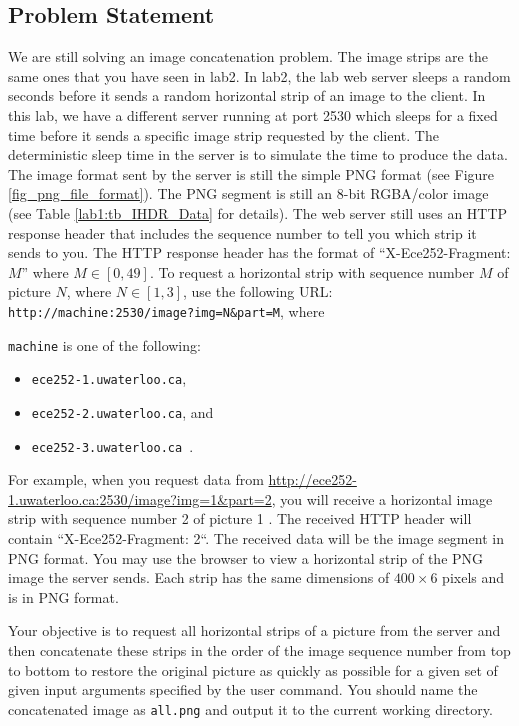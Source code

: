 \subsection{Problem Statement}
We are still solving an image concatenation problem. The image strips are the same ones that you have seen in lab2. In lab2, the lab web server sleeps a random seconds before it sends a random horizontal strip of an image to the client. In this lab, we have a different server running at port 2530 which sleeps for a fixed time before it sends a specific image strip requested by the client. The deterministic sleep time in the server is to simulate the time to produce the data. The image format sent by the server is still the simple PNG format (see Figure \ref{fig_png_file_format}). The PNG segment is still an 8-bit RGBA/color image (see Table \ref{lab1:tb_IHDR_Data} for details). The web server still uses an HTTP response header that includes the sequence number to tell you which strip it sends to you. The HTTP response header has the format of ``X-Ece252-Fragment: $M$'' where $M \in [0, 49]$. To request a  horizontal strip with sequence number $M$ of picture $N$, where $N\in[1, 3]$, use the following URL:
\verb+http://machine:2530/image?img=N&part=M+, where

\texttt{machine} is one of the following:
\begin{itemize}
\item \texttt{ece252-1.uwaterloo.ca},
\item \texttt{ece252-2.uwaterloo.ca}, and 
\item \texttt{ece252-3.uwaterloo.ca}~.
\end{itemize}

For example, when you request data from
\url{http://ece252-1.uwaterloo.ca:2530/image?img=1\&part=2}, 
you will receive a horizontal image strip with sequence number 2 of picture 1 . The received HTTP header will contain ``X-Ece252-Fragment: 2``. The received data will be the image segment in PNG format.
You may use the browser to view a horizontal strip of the PNG image the server sends. Each strip has the same dimensions of $400 \times 6$ pixels and is in PNG format. 

Your objective is to request all horizontal strips of a picture from the server and then concatenate these strips in the order of the image sequence number from top to bottom to restore the original picture as quickly as possible for a given set of given input arguments specified by the user command. You should name the concatenated image as \verb+all.png+ and output it to the current working directory.

